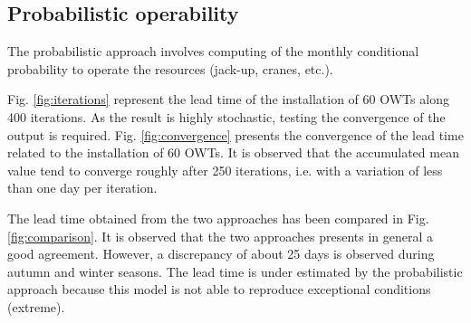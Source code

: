 \subsection{Probabilistic operability}
The probabilistic approach involves computing of the monthly conditional probability to operate the resources (jack-up, cranes, etc.). %

Fig. \ref{fig:iterations} represent the lead time of the installation of 60 OWTs along 400 iterations. As the result is highly stochastic, testing the convergence of the output is required. Fig. \ref{fig:convergence} presents the convergence of the lead time related to the installation of 60 OWTs. It is observed that the accumulated mean value tend to converge roughly after 250 iterations, i.e. with a variation of less than one day per iteration.

The lead time obtained from the two approaches has been compared in Fig. \ref{fig:comparison}. It is observed that the two approaches presents in general a good agreement. However, a discrepancy of about 25 days is observed during autumn and winter seasons. The lead time is under estimated by the probabilistic approach because this model is not able to reproduce exceptional conditions (extreme).


